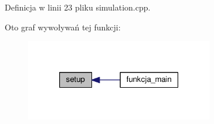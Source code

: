 Definicja w linii 23 pliku simulation.\-cpp.



Oto graf wywoływań tej funkcji\-:\nopagebreak
\begin{figure}[H]
\begin{center}
\leavevmode
\includegraphics[width=232pt]{simulation_8hh_abf5adaaaf59fb394dd7b3c5d4bcaaa1a_icgraph}
\end{center}
\end{figure}


